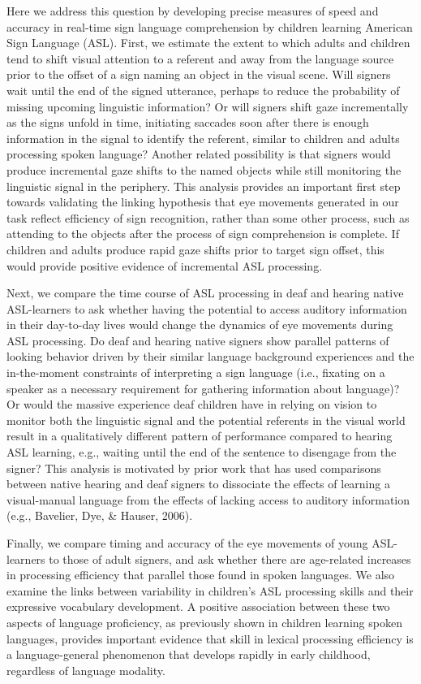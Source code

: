 \documentclass[oneside]{report}
\begin{document}
Here we address this question by developing precise measures of speed
and accuracy in real-time sign language comprehension by children
learning American Sign Language (ASL). First, we estimate the extent to
which adults and children tend to shift visual attention to a referent
and away from the language source prior to the offset of a sign naming
an object in the visual scene. Will signers wait until the end of the
signed utterance, perhaps to reduce the probability of missing upcoming
linguistic information? Or will signers shift gaze incrementally as the
signs unfold in time, initiating saccades soon after there is enough
information in the signal to identify the referent, similar to children
and adults processing spoken language? Another related possibility is
that signers would produce incremental gaze shifts to the named objects
while still monitoring the linguistic signal in the periphery. This
analysis provides an important first step towards validating the linking
hypothesis that eye movements generated in our task reflect efficiency
of sign recognition, rather than some other process, such as attending
to the objects after the process of sign comprehension is complete. If
children and adults produce rapid gaze shifts prior to target sign
offset, this would provide positive evidence of incremental ASL
processing.

Next, we compare the time course of ASL processing in deaf and hearing
native ASL-learners to ask whether having the potential to access
auditory information in their day-to-day lives would change the dynamics
of eye movements during ASL processing. Do deaf and hearing native
signers show parallel patterns of looking behavior driven by their
similar language background experiences and the in-the-moment
constraints of interpreting a sign language (i.e., fixating on a speaker
as a necessary requirement for gathering information about language)? Or
would the massive experience deaf children have in relying on vision to
monitor both the linguistic signal and the potential referents in the
visual world result in a qualitatively different pattern of performance
compared to hearing ASL learning, e.g., waiting until the end of the
sentence to disengage from the signer? This analysis is motivated by
prior work that has used comparisons between native hearing and deaf
signers to dissociate the effects of learning a visual-manual language
from the effects of lacking access to auditory information (e.g.,
Bavelier, Dye, \& Hauser, 2006).

Finally, we compare timing and accuracy of the eye movements of young
ASL-learners to those of adult signers, and ask whether there are
age-related increases in processing efficiency that parallel those found
in spoken languages. We also examine the links between variability in
children's ASL processing skills and their expressive vocabulary
development. A positive association between these two aspects of
language proficiency, as previously shown in children learning spoken
languages, provides important evidence that skill in lexical processing
efficiency is a language-general phenomenon that develops rapidly in
early childhood, regardless of language modality.
\end{document}
